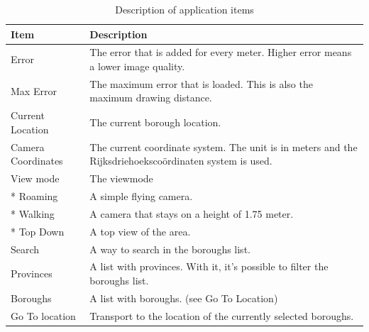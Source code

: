 \documentclass[11pt,a4paper]{report}
\begin{document}
\begin{table}[htbp]
  \centering
  \caption{Description of application items}
    \begin{tabular}{lp{10cm}}
    \toprule
    Item  & Description \\
    \toprule
    Error & The error that is added for every meter. Higher error means a lower image quality. \\\midrule
    Max Error & The maximum error that is loaded. This is also the maximum drawing distance. \\\midrule
    Current Location & The current borough location. \\\midrule
    Camera Coordinates & The current coordinate system. The unit is in meters and the Rijksdriehoekscoördinaten system is used. \\\midrule
    View mode & The viewmode \\\midrule
    * Roaming & A simple flying camera. \\\midrule
    * Walking & A camera that stays on a height of 1.75 meter. \\\midrule
    * Top Down & A top view of the area. \\\midrule
    Search & A way to search in the boroughs list. \\\midrule
    Provinces & A list with provinces. With it, it's possible to filter the boroughs list. \\\midrule
    Boroughs & A list with boroughs. (see Go To Location) \\\midrule
    Go To location & Transport to the location of the currently selected boroughs. \\
    \bottomrule
    \end{tabular}%
  \label{tab:descriptionItems}%
\end{table}%
\end{document}
